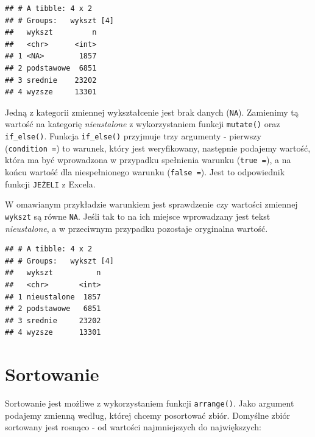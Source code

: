 \documentclass[]{book}
\newenvironment{Shaded}{\begin{snugshade}}{\end{snugshade}}
\newcommand{\KeywordTok}[1]{\textcolor[rgb]{0.13,0.29,0.53}{\textbf{#1}}}
\newcommand{\DataTypeTok}[1]{\textcolor[rgb]{0.13,0.29,0.53}{#1}}
\newcommand{\StringTok}[1]{\textcolor[rgb]{0.31,0.60,0.02}{#1}}
\newcommand{\OperatorTok}[1]{\textcolor[rgb]{0.81,0.36,0.00}{\textbf{#1}}}
\newcommand{\NormalTok}[1]{#1}
\begin{document}
\begin{verbatim}
## # A tibble: 4 x 2
## # Groups:   wykszt [4]
##   wykszt         n
##   <chr>      <int>
## 1 <NA>        1857
## 2 podstawowe  6851
## 3 srednie    23202
## 4 wyzsze     13301
\end{verbatim}

Jedną z kategorii zmiennej wykształcenie jest brak danych (\texttt{NA}).
Zamienimy tą wartość na kategorię \emph{nieustalone} z wykorzystaniem
funkcji \texttt{mutate()} oraz \texttt{if\_else()}. Funkcja
\texttt{if\_else()} przyjmuje trzy argumenty - pierwszy
(\texttt{condition\ =}) to warunek, który jest weryfikowany, następnie
podajemy wartość, która ma być wprowadzona w przypadku spełnienia
warunku (\texttt{true\ =}), a na końcu wartość dla niespełnionego
warunku (\texttt{false\ =}). Jest to odpowiednik funkcji \texttt{JEŻELI}
z Excela.

W omawianym przykładzie warunkiem jest sprawdzenie czy wartości zmiennej
\texttt{wykszt} są równe \texttt{NA}. Jeśli tak to na ich miejsce
wprowadzany jest tekst \emph{nieustalone}, a w przeciwnym przypadku
pozostaje oryginalna wartość.

\begin{Shaded}
\end{Shaded}

\begin{verbatim}
## # A tibble: 4 x 2
## # Groups:   wykszt [4]
##   wykszt          n
##   <chr>       <int>
## 1 nieustalone  1857
## 2 podstawowe   6851
## 3 srednie     23202
## 4 wyzsze      13301
\end{verbatim}

\section{Sortowanie}\label{sortowanie}

Sortowanie jest możliwe z wykorzystaniem funkcji \texttt{arrange()}.
Jako argument podajemy zmienną według, której chcemy posortować zbiór.
Domyślne zbiór sortowany jest rosnąco - od wartości najmniejszych do
największych:
\end{document}
